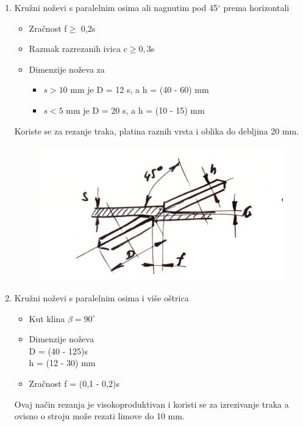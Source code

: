 \documentclass[a4paper,12pt]{article}
\numberwithin{figure}{section}
\begin{document}
\begin{enumerate}
\begin{figure}[!h]
\end{figure}
\FloatBarrier
\item Kružni noževi s paralelnim osima ali nagnutim pod 45$^{\circ}$ prema horizontali 
\begin{itemize}
\item Zračnost f$\geqslant$ 0,2s
\item Razmak razrezanih ivica c$\geqslant 0,3$s
\item Dimenzije noževa za
\begin{itemize}
\item $s>10$ mm je D = 12 s, a h = (40 - 60) mm
\item $s<5$ mm je D = 20 s, a h = (10 - 15) mm
\end{itemize}
\end{itemize}
Koriste se za rezanje traka, platina raznih vrsta i oblika do debljina 20 mm.
\begin{figure}[!h]
\centering
\includegraphics[scale=0.2]{image_55-1.png}
\end{figure}
\FloatBarrier
\item Kružni noževi s paralelnim osima i više oštrica
\begin{itemize}
\item Kut klina $\beta = 90^{\circ}$
\item Dimenzije noževa \\
D = (40 - 125)s\\
h = (12 - 30) mm
\item Zračnost f = (0,1 - 0,2)s
\end{itemize}
Ovaj način rezanja je visokoproduktivan i koristi se za izrezivanje traka a ovisno o stroju može rezati limove do 10 mm.
\begin{figure}[!h]
\centering

\end{figure}
\end{enumerate}
\end{document}
